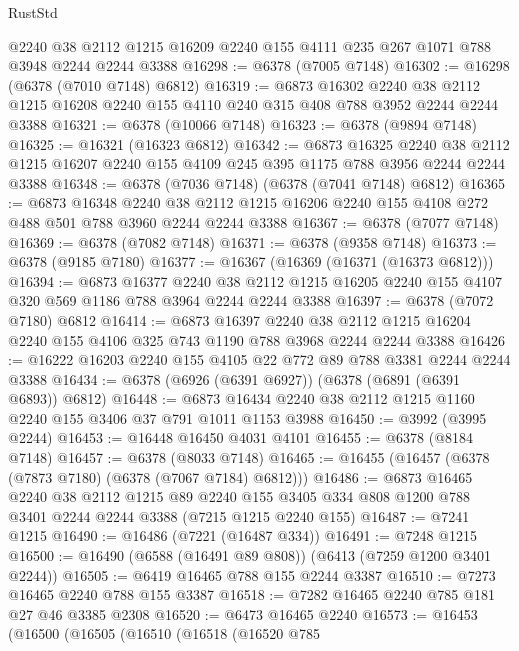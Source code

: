 \begin{lexlean}{RustStd}
\begin{coremodule}
    @2240
    @38
    @2112
    @1215
    @16209
    @2240
    @155
    @4111
    @235
    @267
    @1071
    @788
    @3948
    @2244
    @2244
    @3388
@16298 := @6378 (@7005 @7148)
@16302 := @16298 (@6378 (@7010 @7148) @6812)
@16319 := @6873
    @16302
    @2240
    @38
    @2112
    @1215
    @16208
    @2240
    @155
    @4110
    @240
    @315
    @408
    @788
    @3952
    @2244
    @2244
    @3388
@16321 := @6378 (@10066 @7148)
@16323 := @6378 (@9894 @7148)
@16325 := @16321 (@16323 @6812)
@16342 := @6873
    @16325
    @2240
    @38
    @2112
    @1215
    @16207
    @2240
    @155
    @4109
    @245
    @395
    @1175
    @788
    @3956
    @2244
    @2244
    @3388
@16348 := @6378 (@7036 @7148) (@6378 (@7041 @7148) @6812)
@16365 := @6873
    @16348
    @2240
    @38
    @2112
    @1215
    @16206
    @2240
    @155
    @4108
    @272
    @488
    @501
    @788
    @3960
    @2244
    @2244
    @3388
@16367 := @6378 (@7077 @7148)
@16369 := @6378 (@7082 @7148)
@16371 := @6378 (@9358 @7148)
@16373 := @6378 (@9185 @7180)
@16377 := @16367 (@16369 (@16371 (@16373 @6812)))
@16394 := @6873
    @16377
    @2240
    @38
    @2112
    @1215
    @16205
    @2240
    @155
    @4107
    @320
    @569
    @1186
    @788
    @3964
    @2244
    @2244
    @3388
@16397 := @6378 (@7072 @7180) @6812
@16414 := @6873
    @16397
    @2240
    @38
    @2112
    @1215
    @16204
    @2240
    @155
    @4106
    @325
    @743
    @1190
    @788
    @3968
    @2244
    @2244
    @3388
@16426 := @16222 @16203 @2240 @155 @4105 @22 @772 @89 @788 @3381 @2244 @2244 @3388
@16434 := @6378 (@6926 (@6391 @6927)) (@6378 (@6891 (@6391 @6893)) @6812)
@16448 := @6873 @16434 @2240 @38 @2112 @1215 @1160 @2240 @155 @3406 @37 @791 @1011 @1153 @3988
@16450 := @3992 (@3995 @2244)
@16453 := @16448 @16450 @4031 @4101
@16455 := @6378 (@8184 @7148)
@16457 := @6378 (@8033 @7148)
@16465 := @16455 (@16457 (@6378 (@7873 @7180) (@6378 (@7067 @7184) @6812)))
@16486 := @6873
    @16465
    @2240
    @38
    @2112
    @1215
    @89
    @2240
    @155
    @3405
    @334
    @808
    @1200
    @788
    @3401
    @2244
    @2244
    @3388
    (@7215 @1215 @2240 @155)
@16487 := @7241 @1215
@16490 := @16486 (@7221 (@16487 @334))
@16491 := @7248 @1215
@16500 := @16490 (@6588 (@16491 @89 @808)) (@6413 (@7259 @1200 @3401 @2244))
@16505 := @6419 @16465 @788 @155 @2244 @3387
@16510 := @7273 @16465 @2240 @788 @155 @3387
@16518 := @7282 @16465 @2240 @785 @181 @27 @46 @3385 @2308
@16520 := @6473 @16465 @2240
@16573 := @16453
    (@16500
      (@16505
        (@16510
          (@16518
            (@16520
              @785

\end{coremodule}
\end{lexlean}
